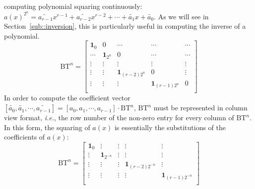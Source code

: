 \documentclass[runningheads]{llncs}
\begin{document}
computing polynomial squaring continuously:
$a(x)^{2^n}=\widetilde{a_{r-1}}x^{r-1}+\widetilde{a_{r-2}}x^{r-2}+\cdots + \widetilde{a_{1}}x +\widetilde{a_0}$.
As we will see in Section~\ref{sub::inversion},
this is particularly useful in computing the
inverse of a polynomial.
\[
\text{BT}^n =
\left[ \begin{array}{ccccc}
\mathbf{1}_{0}&0&\cdots&\cdots&\cdots  \\
\cdots&\mathbf{1}_{2^n}&0 &\cdots&\cdots \\
\vdots&\vdots&\vdots&\vdots&\vdots\\
\vdots&\vdots&\mathbf{1}_{(r-2)2^n}&0&\vdots\\
\vdots&\vdots&\vdots&\mathbf{1}_{(r-1)2^n}&0\\
\end{array}
\right ]
\]
%
In order to compute the coefficient vector $[\widetilde{a_{0}},\widetilde{a_{1}},\cdots,\widetilde{a_{r-1}}]=[{a_{0}},{a_{1}},\cdots,{a_{r-1}}]
\cdot \text{BT}^n$, $\text{BT}^n$ must be represented in column view format, \textit{i.e.},
the row number of the non-zero entry for every column of $\text{BT}^n$. In this form, the squaring of $a(x)$ is essentially the substitutions of the coefficients of $a(x)$:
\[
\text{BT}^n =
\left[ \begin{array}{ccccc}
\mathbf{1}_{0}&\vdots& \vdots&\vdots&\vdots \\
\vdots&\mathbf{1}_{2^{-n}}&\vdots&\vdots&\vdots\\
\vdots&\vdots&\vdots&\mathbf{1}_{(r-2)2^{-n}}&\vdots\\
\vdots&\vdots&\vdots&\vdots&\mathbf{1}_{(r-1)2^{-n}}\\
\end{array}
\right ]
\]
\end{document}
